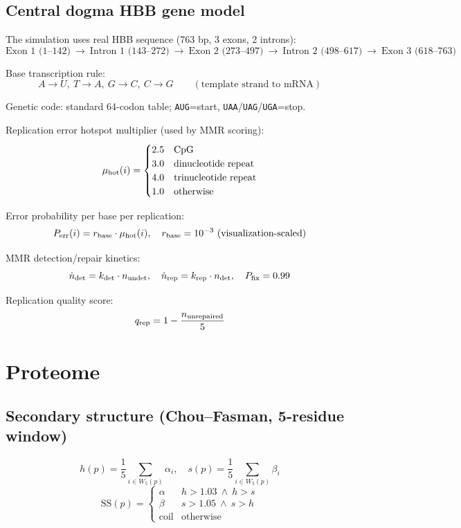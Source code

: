 \documentclass[11pt,a4paper]{article}
\newcommand{\eq}[1]{\begin{equation}#1\end{equation}}
\begin{document}
\subsection{Central dogma HBB gene model}
\label{sec:dogma}
The simulation uses real HBB sequence (763 bp, 3 exons, 2 introns):
\[\text{Exon 1 (1--142)}\ \to\ \text{Intron 1 (143--272)}\ \to\ \text{Exon 2 (273--497)}\ \to\ \text{Intron 2 (498--617)}\ \to\ \text{Exon 3 (618--763)}\]

Base transcription rule:
\[ A\to U,\ T\to A,\ G\to C,\ C\to G\qquad(\text{template strand to mRNA}) \]

Genetic code: standard 64-codon table; \texttt{AUG}=start, \texttt{UAA}/\texttt{UAG}/\texttt{UGA}=stop.

Replication error hotspot multiplier (used by MMR scoring):
\eq{ \mu_{\rm hot}(i) = \begin{cases}2.5 & \text{CpG}\\3.0 & \text{dinucleotide repeat}\\4.0 & \text{trinucleotide repeat}\\1.0 & \text{otherwise}\end{cases} }

Error probability per base per replication:
\eq{ P_{\rm err}(i) = r_{\rm base}\cdot\mu_{\rm hot}(i),\quad r_{\rm base}=\SI{e-3}{}\text{ (visualization-scaled)} }

MMR detection/repair kinetics:
\eq{ \dot n_{\rm det} = k_{\rm det}\cdot n_{\rm undet},\quad \dot n_{\rm rep}=k_{\rm rep}\cdot n_{\rm det},\quad P_{\rm fix}=0.99 }

Replication quality score:
\eq{ q_{\rm rep} = 1 - \frac{n_{\rm unrepaired}}{5} }

\clearpage
\section{Proteome}
\label{sec:proteome}

\subsection{Secondary structure (Chou--Fasman, 5-residue window)}
\eq{ h(p) = \frac{1}{5}\sum_{i\in W_5(p)}\alpha_i,\quad s(p) = \frac{1}{5}\sum_{i\in W_5(p)}\beta_i }
\eq{ \mathrm{SS}(p) = \begin{cases}\alpha & h>1.03\ \land\ h>s \\ \beta & s>1.05\ \land\ s>h \\ \text{coil} & \text{otherwise}\end{cases} }
\end{document}
